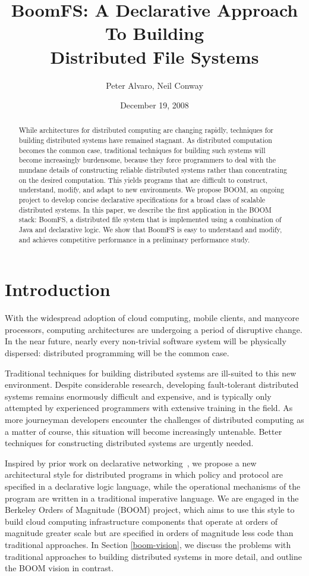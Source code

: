 \documentclass[twocolumn]{article}
\title{BoomFS: A Declarative Approach To Building\\Distributed File Systems}
\author{Peter Alvaro, Neil Conway}
\date{December 19, 2008}
\begin{document}
\maketitle
\begin{abstract}
  While architectures for distributed computing are changing rapidly,
  techniques for building distributed systems have remained
  stagnant. As distributed computation becomes the common case,
  traditional techniques for building such systems will become
  increasingly burdensome, because they force programmers to deal with
  the mundane details of constructing reliable distributed systems
  rather than concentrating on the desired computation. This yields
  programs that are difficult to construct, understand, modify, and
  adapt to new environments. We propose BOOM, an ongoing project to
  develop concise declarative specifications for a broad class of
  scalable distributed systems. In this paper, we describe the first
  application in the BOOM stack: BoomFS, a distributed file system
  that is implemented using a combination of Java and declarative
  logic. We show that BoomFS is easy to understand and modify, and
  achieves competitive performance in a preliminary performance study.
\end{abstract}
\section{Introduction}
\label{introduction}
With the widespread adoption of cloud computing, mobile clients, and
manycore processors, computing architectures are undergoing a period
of disruptive change. In the near future, nearly every non-trivial
software system will be physically dispersed: distributed programming
will be the common case.

Traditional techniques for building distributed systems are ill-suited
to this new environment. Despite considerable research, developing
fault-tolerant distributed systems remains enormously difficult and
expensive, and is typically only attempted by experienced programmers
with extensive training in the field. As more journeyman developers
encounter the challenges of distributed computing as a matter of
course, this situation will become increasingly untenable. Better
techniques for constructing distributed systems are urgently needed.

Inspired by prior work on declarative networking~\cite{dn-sigmod,
  network-data-indep}, we propose a new architectural style for
distributed programs in which policy and protocol are specified in a
declarative logic language, while the operational mechanisms of the
program are written in a traditional imperative language. We are
engaged in the Berkeley Orders of Magnitude (BOOM) project, which aims
to use this style to build cloud computing infrastructure components
that operate at orders of magnitude greater scale but are specified in
orders of magnitude less code than traditional approaches. In Section
\ref{boom-vision}, we discuss the problems with traditional approaches
to building distributed systems in more detail, and outline the BOOM
vision in contrast.
\end{document}

